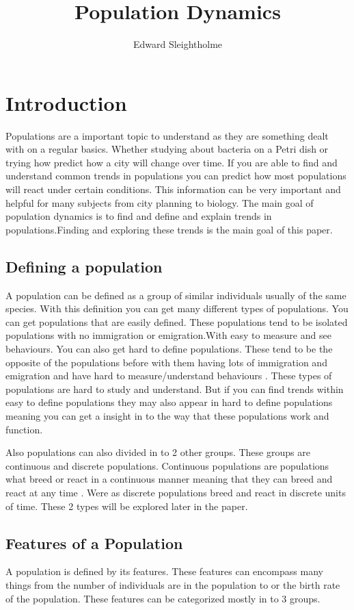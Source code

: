 \documentclass[final]{cmpreport}
\title{Population Dynamics}
\author{Edward Sleightholme}
\begin{document}
\section{Introduction}
Populations are a important topic to understand as they are something dealt with on a regular basics. Whether studying about bacteria on a  Petri dish or trying how predict how a city will change over time. If you are able to find and understand common trends in populations you can predict how most populations will react under certain conditions. This information can be very important and helpful for many subjects from city planning to biology. The main goal of population dynamics is to find and define and explain trends in populations.Finding and exploring these trends is the main goal of this paper.

\subsection {Defining a population}
A population can be defined as a group of similar individuals usually of the same species. With this definition you can get many different types of populations. You can get populations that are easily defined. These populations tend to be isolated populations with no immigration or emigration.With easy to measure and see behaviours. You can also get hard to define populations. These tend to be the opposite of the populations before with them having lots of immigration and emigration and have hard to measure/understand behaviours . These types of populations are hard to study and understand. But if you can find trends within easy to define populations they may also appear in hard to define populations meaning you can get a insight in to the way that these populations work and function.

Also populations can also divided in to 2 other groups. These groups are continuous and discrete populations. Continuous populations are populations what breed or react in a continuous manner meaning that they can breed and react at any time . Were as discrete populations breed and react in discrete units of time. These 2 types will be explored later in the paper.

\subsection {Features of a Population}

A population is defined by its features. These features can encompass many things from the number of individuals are in the population to or the birth rate of the population. These features can be categorized mostly in to 3 groups.
\end{document}
